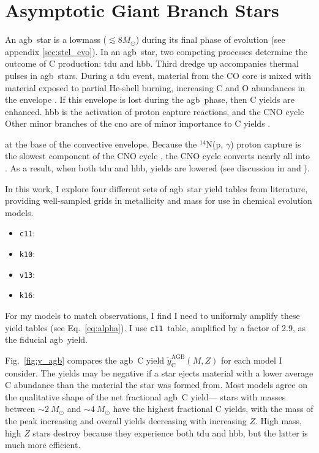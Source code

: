 \documentclass[12pt,oneside,letterpaper]{report}
\newcommand{\agb}{\gls{agb}}
\newcommand{\cxi}{\texttt{\gls{c11}}}
\newcommand{\kx}{\texttt{\gls{k10}}}
\newcommand{\kxvi}{\texttt{\gls{k16}}}
\newcommand{\vxiii}{\texttt{\gls{v13}}}
\newcommand{\sun}{\odot}
\newcommand{\about}[1]{${\sim} #1$}
\begin{document}
\section{Asymptotic Giant Branch Stars}\label{sec:agb}


An \agb\ star is a \gls{lowmass} ($\lesssim 8 M_{\sun}$) during its final phase of evolution (see appendix \ref{sec:stel_evo}).  In an \agb\ star, two competing processes determine the outcome of C production: \gls{tdu} and \gls{hbb}.  Third dredge up accompanies thermal pulses in \agb\ stars. During a \gls{tdu} event, material from the CO core is mixed with material exposed to partial He-shell burning, increasing C and O abundances in the envelope \citep{KL14}. If this envelope is lost during the \agb\ phase, then C yields are enhanced.
\gls{hbb} is the activation of proton capture reactions, and the CNO cycle%
Other minor branches of the \gls{cno} are of minor importance to C yields
 \citep{solar-fusion}.

at the base of the convective envelope. Because the $^{14}$N(p, $\gamma$) proton capture is the slowest component of the CNO cycle \citep{solar-fusion}, the CNO cycle converts nearly all  into .
As a result, when both \gls{tdu} and \gls{hbb},  yields are lowered (see discussion in \citealt{james+23} and \citealt{ventura+13}).

    In this work, I explore four different sets of \agb\ star yield tables from literature, providing well-sampled grids in \gls{metallicity} and mass for use in chemical evolution models. 
\begin{itemize}
    \item \cxi: \citet{cristallo+11, cristallo+15}
    \item \kx: \citet{karakas10}
    \item \vxiii: \citet{ventura+13,ventura+14,ventura+18, ventura+20}
    \item \kxvi: \citet{KL16, karakas+18}
\end{itemize}
For my models to match observations, I find I need to uniformly amplify these yield tables (see Eq.~\ref{eq:alpha}). I use \cxi\ table, amplified by a factor of 2.9, as the fiducial \agb\ yield.

Fig.~\ref{fig:y_agb} compares the \agb\ C yield $\tilde{y}_\text{C}^\text{AGB}(M, Z)$ for each model I consider. 
The yields may be negative if a star ejects material with a lower average C abundance than the material the star was formed from.
Most models agree on the qualitative shape of the net fractional \agb\ C yield---%
stars with masses between \about{2~M_\odot} and \about{4~M_\odot} have the highest fractional C yields, with the mass of the peak increasing and overall yields decreasing with increasing $Z$.  High mass, high $Z$ stars destroy  because they experience both \gls{tdu} and \gls{hbb}, but the latter is much more efficient.
\end{document}
